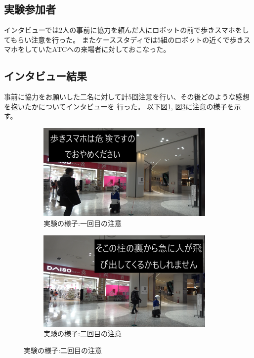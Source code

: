\documentclass{kuisthesis}
\begin{document}
\subsection{実験参加者}
インタビューでは2人の事前に協力を頼んだ人にロボットの前で歩きスマホをしてもらい注意を行った。
またケーススタディでは5組のロボットの近くで歩きスマホをしていたATCへの来場者に対しておこなった。

\subsection{インタビュー結果}
事前に協力をお願いした二名に対して計5回注意を行い、その後どのような感想を抱いたかについてインタビューを
行った。
以下図\ref{fig: Experimentjani}, 図\ref{fig: Experimentjani2}に注意の様子を示す。
\begin{figure}[H]

  \begin{subfigure}{0.5\textwidth}
    \centering
    \includegraphics[width=0.95\textwidth]{img/jani2.png}
    \caption{実験の様子:一回目の注意}
    \label{fig: Experimentjani}
  \end{subfigure}
  \begin{subfigure}{0.5\textwidth}
    \centering
    \includegraphics[width=0.95\textwidth]{img/jani3.png}
    \caption{実験の様子:二回目の注意}
    \label{fig: Experimentjani2}
  \end{subfigure}
\end{figure}
\end{document}
